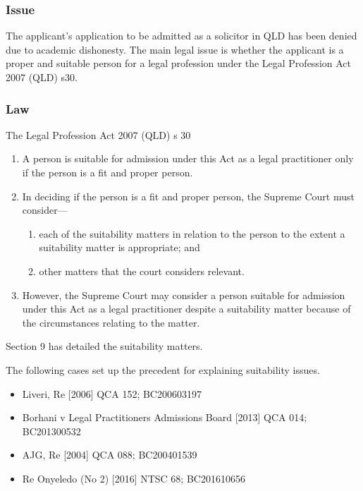 \subsubsection*{Issue}
The applicant's application to be admitted as a solicitor in QLD has been denied due to academic dishonesty. The main legal issue is whether the applicant is a proper and suitable person for a legal profession under the Legal Profession Act 2007 (QLD) s30.

\subsubsection*{Law}
The Legal Profession Act 2007 (QLD) s 30
\begin{center}
    \begin{enumerate}
        \item A person is suitable for admission under this Act as a legal practitioner only if the person is a fit and proper person.
        \item  In deciding if the person is a fit and proper person, the Supreme Court must consider—
            \begin{enumerate}
                \item each of the suitability matters in relation to the person to the extent a suitability matter is appropriate; and
                \item other matters that the court considers relevant.
            \end{enumerate}
        \item  However, the Supreme Court may consider a person suitable for admission under this Act as a legal practitioner despite a suitability matter because of the circumstances relating to the matter.
    \end{enumerate}
\end{center}

Section 9 has detailed the suitability matters. 

The following cases set up the precedent for explaining suitability issues. 
\begin{itemize}
    \item Liveri, Re [2006] QCA 152; BC200603197
    \item Borhani v Legal Practitioners Admissions Board [2013] QCA 014; BC201300532
    \item AJG, Re [2004] QCA 088; BC200401539
    \item Re Onyeledo (No 2) [2016] NTSC 68; BC201610656
\end{itemize}


